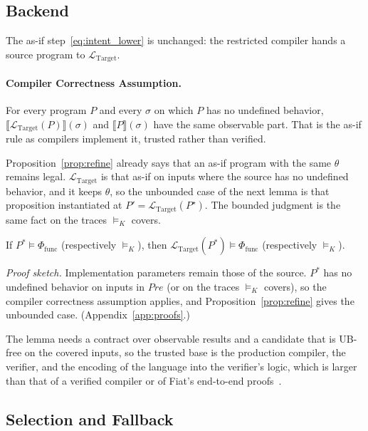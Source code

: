 \subsection{Backend}
\label{sec:backend}

The as-if step~\eqref{eq:intent_lower} is unchanged: the restricted compiler
hands a source program to \(\mathcal{L}_{\text{Target}}\).

\paragraph{Compiler Correctness Assumption.}
For every program \(P\) and every \(\sigma\) on which \(P\) has no undefined
behavior, \(\llbracket \mathcal{L}_{\text{Target}}(P) \rrbracket(\sigma)\)
and \(\llbracket P \rrbracket(\sigma)\) have the same observable part. That
is the as-if rule as compilers implement it, trusted rather than verified.

Proposition~\ref{prop:refine} already says that an as-if program with the
same \(\theta\) remains legal. \(\mathcal{L}_{\text{Target}}\) is that as-if
on inputs where the source has no undefined behavior, and it keeps
\(\theta\), so the unbounded case of the next lemma is that proposition
instantiated at \(P' = \mathcal{L}_{\text{Target}}(P^\star)\). The bounded
judgment is the same fact on the traces \(\models_K\) covers.

\begin{lemma}
\label{lem:lowering}
If \(P^* \models \Phi_{\text{func}}\) (respectively \(\models_K\)), then
\(\mathcal{L}_{\text{Target}}(P^*) \models \Phi_{\text{func}}\)
(respectively \(\models_K\)).
\end{lemma}

\noindent\emph{Proof sketch.} Implementation parameters remain those of the
source. \(P^*\) has no undefined behavior on inputs in \(\mathit{Pre}\) (or
on the traces \(\models_K\) covers), so the compiler correctness assumption
applies, and Proposition~\ref{prop:refine} gives the unbounded case.
(Appendix~\ref{app:proofs}.)

The lemma needs a contract over observable results and a candidate that is
UB-free on the covered inputs, so the trusted base is the production
compiler, the verifier, and the encoding of the language into the verifier's
logic, which is larger than that of a verified compiler or of Fiat's
end-to-end proofs~\cite{leroy2009backend,delaware2015fiat}.

\subsection{Selection and Fallback}
\label{sec:selection}

